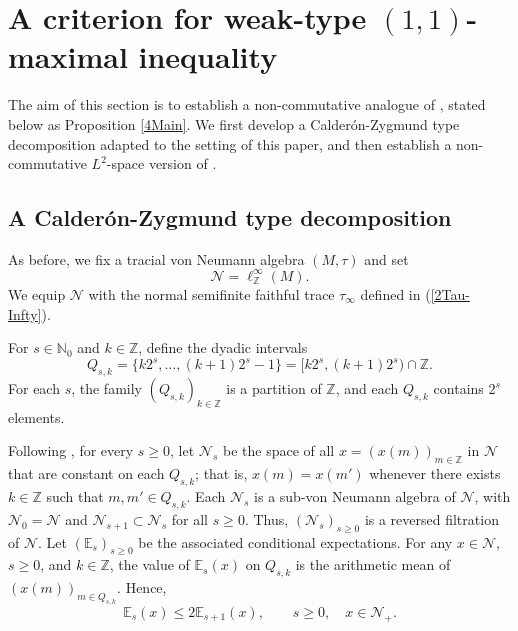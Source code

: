 \documentclass[12pt]{amsart}
\newcommand{\Edb}{\mbox{$\mathbb{E}$}}
\newcommand{\Ndb}{\mbox{$\mathbb{N}$}}
\newcommand{\Zdb}{\mbox{$\mathbb{Z}$}}
\newcommand{\N}{\mbox{${\mathcal N}$}}
\theoremstyle{remark}
\theoremstyle{definition}
\numberwithin{equation}{section}
\begin{document}
\section{A criterion for weak-type
$(1,1)$-maximal inequality}\label{4}

The aim of this section is to establish a non-commutative analogue of
\cite[Proposition 3.1]{LaV}, stated below as Proposition \ref{4Main}.
We first develop a Calder\'on-Zygmund type decomposition adapted to the
setting of this paper, and then establish a non-commutative $L^2$-space
version of \cite[Lemma 4.2]{LaV}.

\subsection{A Calderón-Zygmund type decomposition}\label{CZ}

As before, we fix a tracial von Neumann algebra $(M,\tau)$ and set
$$
\N=\ell^\infty_{\mathbb Z}(M).
$$
We equip $\N$ with the normal semifinite faithful trace $\tau_\infty$
defined in (\ref{2Tau-Infty}).

For $s\in\Ndb_0$ and $k\in\Zdb$, define the dyadic intervals
$$
Q_{s,k}
=\{k2^s,\ldots,(k+1)2^s-1\}
=[k2^s,(k+1)2^s)\cap\Zdb.
$$
For each $s$, the family $(Q_{s,k})_{k\in\mathbb Z}$ is a partition of
$\Zdb$, and each $Q_{s,k}$ contains $2^s$ elements.

Following \cite[Section 2.3]{HLX}, for every $s\geq0$, let $\N_s$ be the
space of all $x=(x(m))_{m\in\mathbb Z}$ in $\N$ that are constant on
each $Q_{s,k}$; that is,
$x(m)=x(m')$ whenever there exists $k\in\mathbb Z$ such that
$m,m'\in Q_{s,k}$.
Each $\N_s$ is a sub-von Neumann algebra of $\N$, with
$\N_0=\N$ and $\N_{s+1}\subset\N_s$ for all $s\geq0$. Thus,
$(\N_s)_{s\geq0}$ is a reversed filtration of $\N$.
Let $(\Edb_s)_{s\geq0}$ be the associated conditional expectations.
For any $x\in\N$, $s\geq0$, and $k\in\Zdb$, the value of
$\Edb_s(x)$ on $Q_{s,k}$ is the arithmetic mean of
$(x(m))_{m\in Q_{s,k}}$. Hence,
\begin{equation}\label{4x2}
\Edb_s(x)\leq 2\Edb_{s+1}(x),
\qquad s\geq0,\quad x\in\N_+.
\end{equation}
\end{document}
